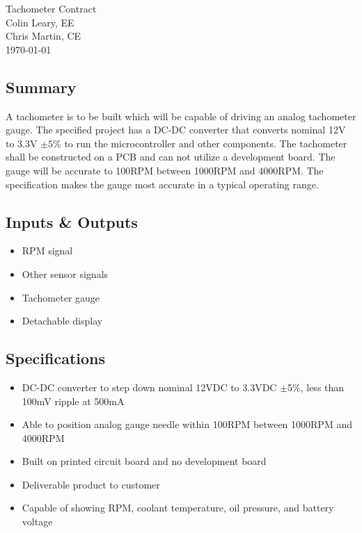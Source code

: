 \begin{singlespacing}
\begin{center}
\LARGE{Tachometer Contract}\\
\vspace{1.3em}
\large{Colin Leary, EE}\hfill\\
\large{Chris Martin, CE}\\
\vspace{1.3em}
\large{\today}

\end{center}


\subsection*{Summary}
A tachometer is to be built which will be capable of driving an analog tachometer gauge. The specified project has a DC-DC converter that converts nominal 12V to 3.3V $\pm5\%$ to run the microcontroller and other components. The tachometer shall be constructed on a PCB and can not utilize a development board. The gauge will be accurate to 100RPM between 1000RPM and 4000RPM. The specification makes the gauge most accurate in a typical operating range.

\subsection*{Inputs \& Outputs}
\begin{itemize}
    \item RPM signal
    \item Other sensor signals
    \item Tachometer gauge
    \item Detachable display
\end{itemize}


\subsection*{Specifications}
\begin{itemize}
    \item DC-DC converter to step down nominal 12VDC to 3.3VDC $\pm$5\%, less than 100mV ripple at 500mA
    \item Able to position analog gauge needle within  100RPM between 1000RPM and 4000RPM
    \item Built on printed circuit board and no development board
    \item Deliverable product to customer
    \item Capable of showing RPM, coolant temperature, oil pressure, and battery voltage
\end{itemize}


\end{singlespacing}
